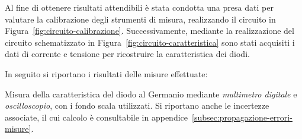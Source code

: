 \documentclass[@MAIN@]{subfiles}
\begin{document}
    Al fine di ottenere risultati attendibili è stata condotta una presa dati per valutare la
    calibrazione degli strumenti di misura, realizzando il circuito in Figura~\ref{fig:circuito-calibrazione}. Successivamente,
    mediante la realizzazione del circuito schematizzato in Figura~\ref{fig:circuito-caratteristica}
    sono stati acquisiti i dati di corrente e tensione per ricostruire la caratteristica dei diodi.\newline

    \noindent In seguito si riportano i risultati delle misure effettuate:\newline
    \vspace{1.5pt}
%
%            
%            
%
%
%
    \begin{table}[ht]
        \centering
        
        \captionsetup{justification=centering} %
        \caption{Misura della caratteristica del diodo al Germanio mediante \textit{multimetro digitale} e
        \textit{oscilloscopio}, con i fondo scala utilizzati. Si riportano anche le incertezze associate,
            il cui calcolo è consultabile in appendice~\ref{subsec:propagazione-errori-misure}.}
        \label{tab:germanio}
    \end{table}
\end{document}
